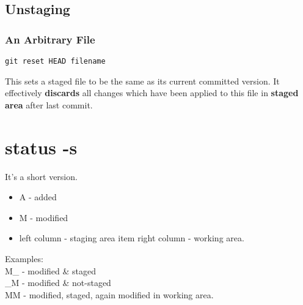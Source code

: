 \documentclass{report}
\begin{document}
\section{Unstaging}

\subsection{An Arbitrary File}
\begin{verbatim}
git reset HEAD filename
\end{verbatim}
This sets a staged file to be the same as its current committed version. It effectively \textbf{discards} all changes which have been applied to this  file
in \textbf{staged area} after last commit.



\chapter{status -s}
It's a short version. 
\begin{itemize}
	\item A - added
	\item M - modified
	\item left column - staging area
	item right column - working area.
\end{itemize}
Examples:\\
M\_ - modified \& staged\\
\_M - modified \& not-staged\\
MM - modified, staged, again modified in working area.
\end{document}
